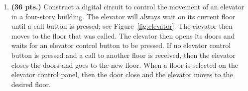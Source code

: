 \begin{enumerate}
\begin{onlysolution}
{                The memory input equations are a snap.

            }
        \end{onlysolution}

    \item \textbf{ (36 pts.)}
        Construct a digital circuit to control the movement of an elevator
        in a four-story building.  The elevator will always wait on its current floor
        until a call button is pressed; see Figure~\ref{fig:elevator}.  The elevator
        then moves to the floor that was called.  The elevator then opens its doors and
        waits for an elevator control button to be pressed.  If no elevator control
        button is pressed and a call to another floor is received, then the elevator
        closes the doors and goes to the new floor.  When a floor is selected on the
        elevator control panel, then the door close and the elevator moves to the
        desired floor.


\end{enumerate}
